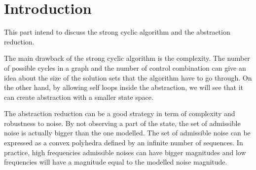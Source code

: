 \section{Introduction}
This part intend to discuss the strong cyclic algorithm and the abstraction reduction.

The main drawback of the strong cyclic algorithm is the complexity.
The number of possible cycles in a graph and the number of control combination can give an idea about the size of the solution sets that the algorithm have to go through.
On the other hand, by allowing self loops inside the abstraction, we will see that it can create abstraction with a smaller state space.

The abstraction reduction can be a good strategy in term of complexity and robustness to noise.
By not observing a part of the state, the set of admissible noise is actually bigger than the one modelled.
The set of admissible noise can be expressed as a convex polyhedra defined by an infinite number of sequences. In practice, high frequencies admissible noises can have bigger magnitudes and low frequencies will have a magnitude equal to the modelled noise magnitude.

